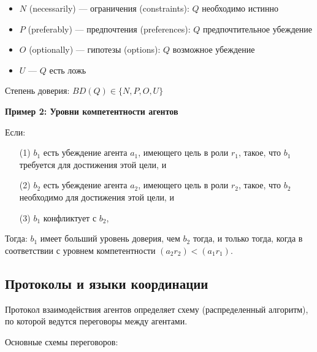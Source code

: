 \begin{itemize}
  \item $N$ (necessarily) — ограничения (constraints): $Q$ необходимо истинно
  \item $P$ (preferably) — предпочтения (preferences): $Q$ предпочтительное убеждение
  \item $O$ (optionally) — гипотезы (options): $Q$ возможное убеждение
  \item $U$ — $Q$ есть ложь
\end{itemize}

Степень доверия: $BD(Q) \in \{N, P, O, U\}$

\textbf{Пример 2: Уровни компетентности агентов}

Если:

\begin{enumerate}
  \item[(1)] $b_1$ есть убеждение агента $a_1$, имеющего цель в роли $r_1$, такое, что $b_1$ требуется для достижения этой цели, и
  \item[(2)] $b_2$ есть убеждение агента $a_2$, имеющего цель в роли $r_2$, такое, что $b_2$ необходимо для достижения этой цели, и
  \item[(3)] $b_1$ конфликтует с $b_2$,
\end{enumerate}

Тогда: $b_1$ имеет больший уровень доверия, чем $b_2$ тогда, и только тогда, когда в соответствии с уровнем компетентности $(a_2 r_2) < (a_1 r_1)$.

\subsection{Протоколы и языки координации}

Протокол взаимодействия агентов определяет схему (распределенный алгоритм), по которой ведутся переговоры между агентами.

Основные схемы переговоров:

